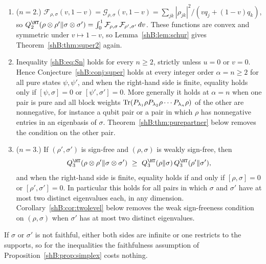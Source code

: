 \begin{theorem}\label{shB:thm:simplex}
\begin{enumerate}[label=(\alph*)]
\item ($n=2$.) $\mathcal F_{\rho,\sigma}(v,1-v)=\mathcal G_{\rho,\sigma}(v,1-v)=\sum_{jk}|\rho_{jk}|^2/(vq_j+(1-v)q_k)$, so $Q^\HT_2(\rho\otimes\rho'\|\sigma\otimes\sigma')=\int_0^1\mathcal F_{\rho,\sigma}\,\mathcal F_{\rho',\sigma'}\,dv$. These functions are convex and symmetric under $v\mapsto1-v$, so Lemma~\ref{shB:lem:schur} gives Theorem~\ref{shB:thm:super2} again.
\item Inequality \eqref{shB:eq:Sn} holds for every $n\ge2$, strictly unless $u=0$ or $v=0$. Hence Conjecture~\ref{shB:conj:super} holds at every integer order $\alpha=n\ge2$ for all pure states $\psi,\psi'$, and when the right-hand side is finite, equality holds only if $[\psi,\sigma]=0$ or $[\psi',\sigma']=0$. More generally it holds at $\alpha=n$ when one pair is pure and all block weights $\operatorname{Tr}(P_{\lambda_1}\rho P_{\lambda_2}\rho\cdots P_{\lambda_n}\rho)$ of the other are nonnegative, for instance a qubit pair or a pair in which $\rho$ has nonnegative entries in an eigenbasis of $\sigma$. Theorem~\ref{shB:thm:purepartner} below removes the condition on the other pair.
\item ($n=3$.) If $(\rho',\sigma')$ is sign-free and $(\rho,\sigma)$ is weakly sign-free, then
\[
Q^\HT_3(\rho\otimes\rho'\|\sigma\otimes\sigma')\ \ge\ Q^\HT_3(\rho\|\sigma)\,Q^\HT_3(\rho'\|\sigma'),
\]
and when the right-hand side is finite, equality holds if and only if $[\rho,\sigma]=0$ or $[\rho',\sigma']=0$. In particular this holds for all pairs in which $\sigma$ and $\sigma'$ have at most two distinct eigenvalues each, in any dimension. Corollary~\ref{shB:cor:twolevel} below removes the weak sign-freeness condition on $(\rho,\sigma)$ when $\sigma'$ has at most two distinct eigenvalues.
\end{enumerate}
If $\sigma$ or $\sigma'$ is not faithful, either both sides are infinite or one restricts to the supports, so for the inequalities the faithfulness assumption of Proposition~\ref{shB:prop:simplex} costs nothing.
\end{theorem}


